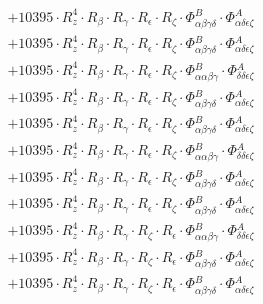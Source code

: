 \documentclass{article}
\begin{document}
\begin{subequations}
\begin{gather}
\begin{array}{c}
 \\[0.2em] 		 + 10395 \cdot R_{z}^{4} \cdot R_{\beta{}} \cdot R_{\gamma{}} \cdot R_{\epsilon{}} \cdot R_{\zeta{}} \cdot \Phi{}^{B}_{\alpha{}\beta{}\gamma{}\delta{}} \cdot \Phi{}^{A}_{\alpha{}\delta{}\epsilon{}\zeta{}} 
 \\[0.2em] 		 + 10395 \cdot R_{z}^{4} \cdot R_{\beta{}} \cdot R_{\gamma{}} \cdot R_{\epsilon{}} \cdot R_{\zeta{}} \cdot \Phi{}^{B}_{\alpha{}\beta{}\gamma{}\delta{}} \cdot \Phi{}^{A}_{\alpha{}\delta{}\epsilon{}\zeta{}} 
 \\[0.2em] 		 + 10395 \cdot R_{z}^{4} \cdot R_{\beta{}} \cdot R_{\gamma{}} \cdot R_{\epsilon{}} \cdot R_{\zeta{}} \cdot \Phi{}^{B}_{\alpha{}\alpha{}\beta{}\gamma{}} \cdot \Phi{}^{A}_{\delta{}\delta{}\epsilon{}\zeta{}} 
 \\[0.2em] 		 + 10395 \cdot R_{z}^{4} \cdot R_{\beta{}} \cdot R_{\gamma{}} \cdot R_{\epsilon{}} \cdot R_{\zeta{}} \cdot \Phi{}^{B}_{\alpha{}\beta{}\gamma{}\delta{}} \cdot \Phi{}^{A}_{\alpha{}\delta{}\epsilon{}\zeta{}} 
 \\[0.2em] 		 + 10395 \cdot R_{z}^{4} \cdot R_{\beta{}} \cdot R_{\gamma{}} \cdot R_{\epsilon{}} \cdot R_{\zeta{}} \cdot \Phi{}^{B}_{\alpha{}\beta{}\gamma{}\delta{}} \cdot \Phi{}^{A}_{\alpha{}\delta{}\epsilon{}\zeta{}} 
 \\[0.2em] 		 + 10395 \cdot R_{z}^{4} \cdot R_{\beta{}} \cdot R_{\gamma{}} \cdot R_{\epsilon{}} \cdot R_{\zeta{}} \cdot \Phi{}^{B}_{\alpha{}\alpha{}\beta{}\gamma{}} \cdot \Phi{}^{A}_{\delta{}\delta{}\epsilon{}\zeta{}} 
 \\[0.2em] 		 + 10395 \cdot R_{z}^{4} \cdot R_{\beta{}} \cdot R_{\gamma{}} \cdot R_{\epsilon{}} \cdot R_{\zeta{}} \cdot \Phi{}^{B}_{\alpha{}\beta{}\gamma{}\delta{}} \cdot \Phi{}^{A}_{\alpha{}\delta{}\epsilon{}\zeta{}} 
 \\[0.2em] 		 + 10395 \cdot R_{z}^{4} \cdot R_{\beta{}} \cdot R_{\gamma{}} \cdot R_{\epsilon{}} \cdot R_{\zeta{}} \cdot \Phi{}^{B}_{\alpha{}\beta{}\gamma{}\delta{}} \cdot \Phi{}^{A}_{\alpha{}\delta{}\epsilon{}\zeta{}} 
 \\[0.2em] 		 + 10395 \cdot R_{z}^{4} \cdot R_{\beta{}} \cdot R_{\gamma{}} \cdot R_{\zeta{}} \cdot R_{\epsilon{}} \cdot \Phi{}^{B}_{\alpha{}\alpha{}\beta{}\gamma{}} \cdot \Phi{}^{A}_{\delta{}\delta{}\epsilon{}\zeta{}} 
 \\[0.2em] 		 + 10395 \cdot R_{z}^{4} \cdot R_{\beta{}} \cdot R_{\gamma{}} \cdot R_{\zeta{}} \cdot R_{\epsilon{}} \cdot \Phi{}^{B}_{\alpha{}\beta{}\gamma{}\delta{}} \cdot \Phi{}^{A}_{\alpha{}\delta{}\epsilon{}\zeta{}} 
 \\[0.2em] 		 + 10395 \cdot R_{z}^{4} \cdot R_{\beta{}} \cdot R_{\gamma{}} \cdot R_{\zeta{}} \cdot R_{\epsilon{}} \cdot \Phi{}^{B}_{\alpha{}\beta{}\gamma{}\delta{}} \cdot \Phi{}^{A}_{\alpha{}\delta{}\epsilon{}\zeta{}} 

\end{array}
\end{gather}
\end{subequations}
\end{document}
